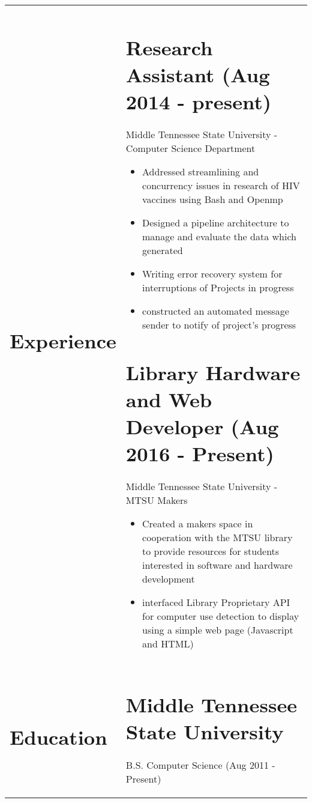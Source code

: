 \documentclass[10pt]{article} %
\begin{document}
\LARGE\noindent{}
\normalsize
\noindent{}
\noindent{}
\noindent{}
\noindent{}
\hrulefill
\renewcommand\arraystretch{0.1}
\begin{tabularx}{\textwidth}{p{3cm} X}
\section*{Experience}

& \section*{Research Assistant (Aug 2014 - present)}
Middle Tennessee State University - Computer Science Department
\begin{itemize}
\setlength{\itemsep}{1pt}
\item Addressed streamlining and concurrency issues in research of HIV vaccines using Bash and Openmp
\item Designed a pipeline architecture to manage and evaluate the data which generated
\item Writing error recovery system for interruptions of Projects in progress
\item constructed an automated message sender to notify of project’s progress
\end{itemize}
\section*{Library Hardware and Web Developer (Aug 2016 - Present)}
Middle Tennessee State University - MTSU Makers
\begin{itemize}
\setlength{\itemsep}{1pt}
\item Created a makers space in cooperation with the MTSU library to provide resources for students interested in software and hardware development
\item interfaced Library Proprietary API for computer use detection to display using a simple web page (Javascript and HTML)
\end{itemize}\\
\section*{Education} & \section*{Middle Tennessee State University}
B.S. Computer Science (Aug 2011 - Present)\\

\end{tabularx}
\end{document}
